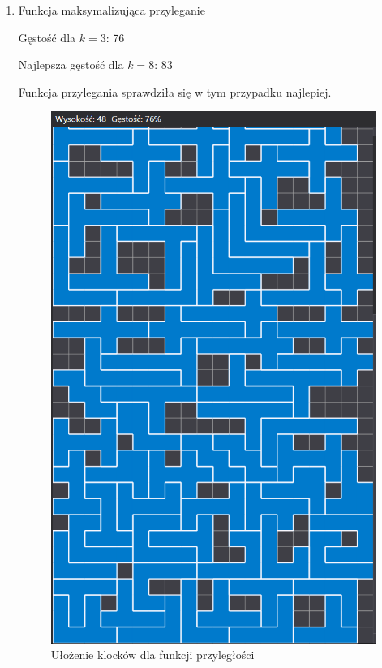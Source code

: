 \documentclass{article}
\begin{document}
\begin{enumerate}
\item Funkcja maksymalizująca przyleganie

Gęstość dla $k=3$: 76

Najlepsza gęstość dla $k=8$: 83

Funkcja przylegania sprawdziła się w tym przypadku najlepiej.

\begin{figure}[H]
\includegraphics[width=\textwidth]{przyleglosc.PNG}
\caption{Ułożenie klocków dla funkcji przyległości}
\end{figure}

\end{enumerate}
\end{document}

